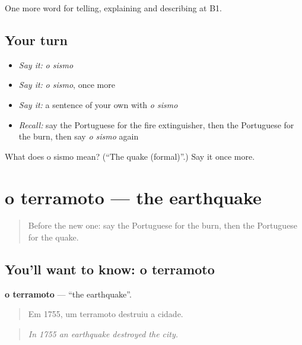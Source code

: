 \begin{grammarlens}[title={What you've built}]
One more word for telling, explaining and describing at B1.
\end{grammarlens}

\subsection*{Your turn}
\begin{itemize}
\raggedright
  \item \emph{Say it:} \emph{o sismo}
  \item \emph{Say it:} \emph{o sismo}, once more
  \item \emph{Say it:} a sentence of your own with \emph{o sismo}
  \item \emph{Recall:} say the Portuguese for the fire extinguisher, then the Portuguese for the burn, then say \emph{o sismo} again
\end{itemize}

\begin{tcolorbox}[breakable,colback=teal!4,colframe=teal!35!black,title={Before you move on}]
What does o sismo mean? (\textquotedblleft{}The quake (formal)\textquotedblright{}.) Say it once more.
\end{tcolorbox}
\section[o terramoto]{o terramoto — the earthquake}

\label{lesson:PT-C302-terramoto}



\begin{quote}
Before the new one: say the Portuguese for the burn, then the Portuguese for the quake.
\end{quote}

\subsection*{You'll want to know: o terramoto}
\textbf{o terramoto} — \textquotedblleft{}the earthquake\textquotedblright{}.

\begin{quote}
Em 1755, um terramoto destruiu a cidade.
\end{quote}

\begin{quote}
\emph{In 1755 an earthquake destroyed the city.}
\end{quote}

